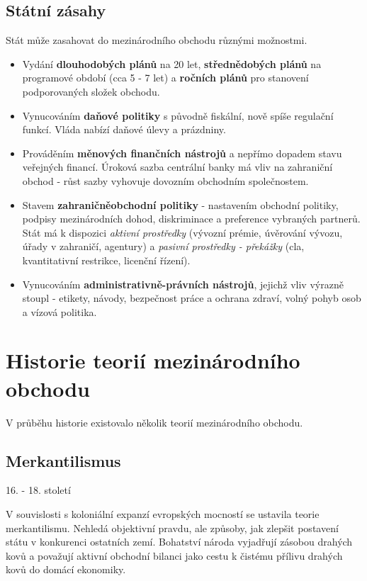 \subsection{Státní zásahy}

Stát může zasahovat do mezinárodního obchodu různými možnostmi.

\begin{itemize}
    \item Vydání \textbf{dlouhodobých plánů} na 20 let, \textbf{střednědobých plánů} na programové období (cca 5 - 7 let) a \textbf{ročních plánů} pro stanovení podporovaných složek obchodu.
    \item Vynucováním \textbf{daňové politiky} s původně fiskální, nově spíše regulační funkcí. Vláda nabízí daňové úlevy a prázdniny.
    \item Prováděním \textbf{měnových finančních nástrojů} a nepřímo dopadem stavu veřejných financí. Úroková sazba centrální banky má vliv na zahraniční obchod - růst sazby vyhovuje dovozním obchodním společnostem.
    \item Stavem \textbf{zahraničněobchodní politiky} - nastavením obchodní politiky, podpisy mezinárodních dohod, diskriminace a preference vybraných partnerů. Stát má k dispozici \textit{aktivní prostředky} (vývozní prémie, úvěrování vývozu, úřady v zahraničí, agentury) a \textit{pasivní prostředky - překážky} (cla, kvantitativní restrikce, licenční řízení).
    \item Vynucováním \textbf{administrativně-právních nástrojů}, jejichž vliv výrazně stoupl - etikety, návody, bezpečnost práce a ochrana zdraví, volný pohyb osob a vízová politika.
\end{itemize}

\section{Historie teorií mezinárodního obchodu}

V průběhu historie existovalo několik teorií mezinárodního obchodu.

\subsection{Merkantilismus}
\epigraph{16. - 18. století}{}

V souvislosti s koloniální expanzí evropských mocností se ustavila teorie merkantilismu. Nehledá objektivní pravdu, ale způsoby, jak zlepšit postavení státu v konkurenci ostatních zemí. Bohatství národa vyjadřují zásobou drahých kovů a považují aktivní obchodní bilanci jako cestu k čistému přílivu drahých kovů do domácí ekonomiky.

